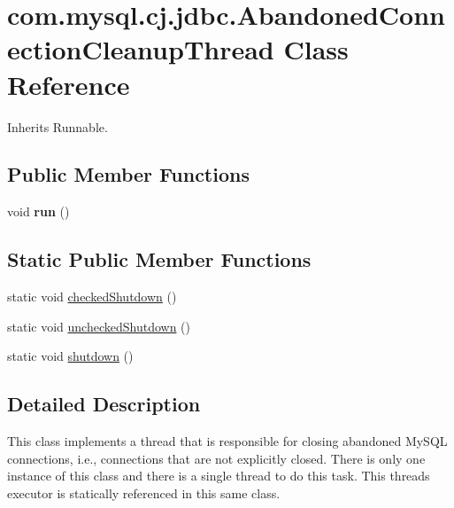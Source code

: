 \hypertarget{classcom_1_1mysql_1_1cj_1_1jdbc_1_1_abandoned_connection_cleanup_thread}{}\section{com.\+mysql.\+cj.\+jdbc.\+Abandoned\+Connection\+Cleanup\+Thread Class Reference}
\label{classcom_1_1mysql_1_1cj_1_1jdbc_1_1_abandoned_connection_cleanup_thread}


Inherits Runnable.

\subsection*{Public Member Functions}
\begin{DoxyCompactItemize}
\item 
\mbox{\label{classcom_1_1mysql_1_1cj_1_1jdbc_1_1_abandoned_connection_cleanup_thread_ae80c545c3f55ec0a58a807e92f357d9d}} 
void {\bfseries run} ()
\end{DoxyCompactItemize}
\subsection*{Static Public Member Functions}
\begin{DoxyCompactItemize}
\item 
static void \mbox{\hyperlink{classcom_1_1mysql_1_1cj_1_1jdbc_1_1_abandoned_connection_cleanup_thread_a196b3b56aefdf849d19c4efabd56d241}{checked\+Shutdown}} ()
\item 
static void \mbox{\hyperlink{classcom_1_1mysql_1_1cj_1_1jdbc_1_1_abandoned_connection_cleanup_thread_aa78dca88c392400bfa168afddcb88ae1}{unchecked\+Shutdown}} ()
\item 
static void \mbox{\hyperlink{classcom_1_1mysql_1_1cj_1_1jdbc_1_1_abandoned_connection_cleanup_thread_a94b85a31e17329347409987ce3eb6daa}{shutdown}} ()
\end{DoxyCompactItemize}


\subsection{Detailed Description}
This class implements a thread that is responsible for closing abandoned My\+S\+QL connections, i.\+e., connections that are not explicitly closed. There is only one instance of this class and there is a single thread to do this task. This thread\textquotesingle{}s executor is statically referenced in this same class. 


